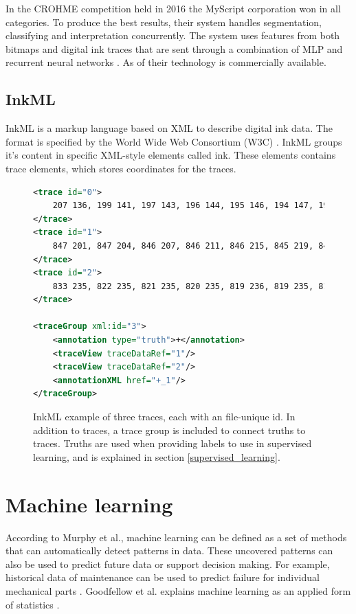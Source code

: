 In the CROHME competition held in 2016 the MyScript corporation won in all categories. To produce the best results, their system handles segmentation, classifying and interpretation concurrently. The system uses features from both bitmaps and digital ink traces that are sent through a combination of MLP and recurrent neural networks \cite{mouchere_icfhr2016_2016}. As of \mydate their technology is commercially available.

\subsection{InkML}
InkML is a markup language based on XML to describe digital ink data. The format is specified by the World Wide Web Consortium (W3C) \cite{chee_ink_2011}. InkML groups it's content in specific XML-style elements called ink. These elements contains trace elements, which stores coordinates for the traces. 

\begin{figure}[H]
\begin{lstlisting}[language=XML]
<trace id="0">
    207 136, 199 141, 197 143, 196 144, 195 146, 194 147, 193 149
</trace>
<trace id="1">
    847 201, 847 204, 846 207, 846 211, 846 215, 845 219, 845 222
</trace>
<trace id="2">
    833 235, 822 235, 821 235, 820 235, 819 236, 819 235, 819 236
</trace>

<traceGroup xml:id="3">
	<annotation type="truth">+</annotation>
	<traceView traceDataRef="1"/>
	<traceView traceDataRef="2"/>
	<annotationXML href="+_1"/>
</traceGroup>
\end{lstlisting}

\caption{InkML example of three traces, each with an file-unique id. In addition to traces, a trace group is included to connect truths to traces. Truths are used when providing labels to use in supervised learning, and is explained in section \ref{supervised_learning}.}

\label{fig:InkML_ex}
\end{figure}

\section{Machine learning}
\label{machine_learning}
According to Murphy et al.\cite{murphy_machine_2012}, machine learning can be defined as a set of methods that can automatically detect patterns in data. These uncovered patterns can also be used to predict future data or support decision making. For example, historical data of maintenance can be used to predict failure for individual mechanical parts \cite{cline_predictive_2017}. Goodfellow et al. explains machine learning as an applied form of statistics \cite{goodfellow_deep_2016}.

